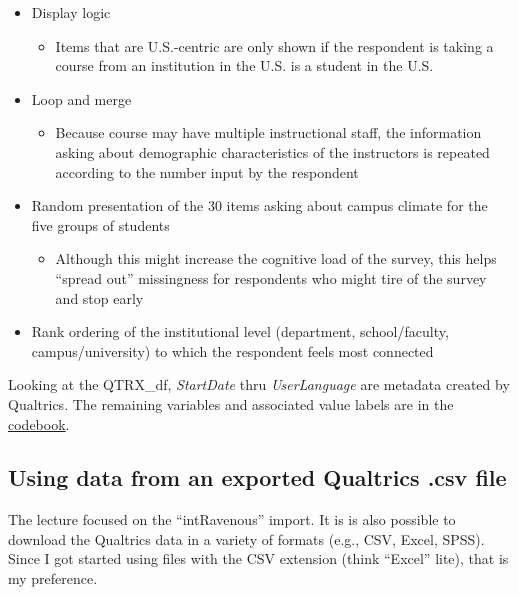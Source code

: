 \documentclass[
  english,
]{book}
\providecommand{\tightlist}{%
  \setlength{\itemsep}{0pt}\setlength{\parskip}{0pt}}
\begin{document}
\begin{itemize}
\tightlist
\item
  Display logic

  \begin{itemize}
  \tightlist
  \item
    Items that are U.S.-centric are only shown if the respondent is taking a course from an institution in the U.S. is a student in the U.S.
  \end{itemize}
\item
  Loop and merge

  \begin{itemize}
  \tightlist
  \item
    Because course may have multiple instructional staff, the information asking about demographic characteristics of the instructors is repeated according to the number input by the respondent
  \end{itemize}
\item
  Random presentation of the 30 items asking about campus climate for the five groups of students

  \begin{itemize}
  \tightlist
  \item
    Although this might increase the cognitive load of the survey, this helps ``spread out'' missingness for respondents who might tire of the survey and stop early
  \end{itemize}
\item
  Rank ordering of the institutional level (department, school/faculty, campus/university) to which the respondent feels most connected
\end{itemize}

Looking at the QTRX\_df, \emph{StartDate} thru \emph{UserLanguage} are metadata created by Qualtrics. The remaining variables and associated value labels are in the \href{./Rate-a-Course_Codebook.pdf}{codebook}.

\hypertarget{using-data-from-an-exported-qualtrics-.csv-file}{%
\subsection{Using data from an exported Qualtrics .csv file}\label{using-data-from-an-exported-qualtrics-.csv-file}}

The lecture focused on the ``intRavenous'' import. It is is also possible to download the Qualtrics data in a variety of formats (e.g., CSV, Excel, SPSS). Since I got started using files with the CSV extension (think ``Excel'' lite), that is my preference.
\end{document}
